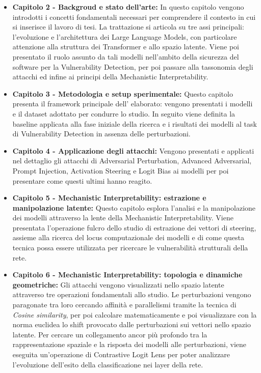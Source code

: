 \begin{itemize}
    \item \textbf{Capitolo 2 - Backgroud e stato dell'arte:} In questo capitolo vengono introdotti i concetti fondamentali necessari per comprendere il contesto in cui si inserisce il lavoro di tesi. La trattazione si articola su tre assi principali: l'evoluzione e l'architettura dei Large Language Models, con particolare attenzione alla struttura dei Transformer e allo spazio latente. Viene poi presentato il ruolo assunto da tali modelli nell'ambito della sicurezza del software per la Vulnerability Detection, per poi passare alla tassonomia degli attacchi ed infine ai principi della Mechanistic Interpretability.
    \item \textbf{Capitolo 3 - Metodologia e setup sperimentale:} Questo capitolo presenta il framework principale dell' elaborato: vengono presentati i modelli e il dataset adottato per condurre lo studio. In seguito viene definita la baseline applicata alla fase iniziale della ricerca e i risultati dei modelli al task di Vulnerability Detection in assenza delle perturbazioni.
    \item \textbf{Capitolo 4 - Applicazione degli attacchi:} Vengono presentati e applicati nel dettaglio gli attacchi di Adversarial Perturbation, Advanced Adversarial, Prompt Injection, Activation Steering e Logit Bias ai modelli per poi presentare come questi ultimi hanno reagito.
    \item \textbf{Capitolo 5 - Mechanistic Interpretability: estrazione e manipolazione latente:} Questo capitolo esplora l'analisi e la manipolazione dei modelli attraverso la lente della Mechanistic Interpretability. Viene presentata l'operazione fulcro dello studio di estrazione dei vettori di steering, assieme alla ricerca del locus computazionale dei modelli e di come questa tecnica possa essere utilizzata per ricercare le vulnerabilità strutturali della rete.
    \item \textbf{Capitolo 6 - Mechanistic Interpretability: topologia e dinamiche geometriche:} Gli attacchi vengono visualizzati nello spazio latente attraverso tre operazioni fondamentali allo studio. Le perturbazioni vengono paragonate tra loro cercando affinità e parallelismi tramite la tecnica di \textit{Cosine similarity}, per poi calcolare matematicamente e poi visualizzare con la norma euclidea lo shift provocato dalle perturbazioni sui vettori nello spazio latente. Per cercare un collegamento ancor più profondo tra la rappresentazione spaziale e la risposta dei modelli alle perturbazioni, viene eseguita un'operazione di Contrastive Logit Lens per poter analizzare l'evoluzione dell'esito della classificazione nei layer della rete.

\end{itemize}
